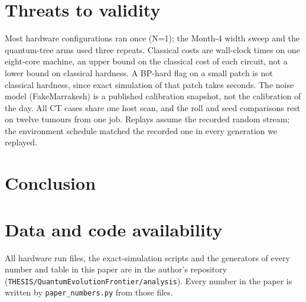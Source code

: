 \documentclass[conference]{IEEEtran}
\begin{document}
\section{Threats to validity}
Most hardware configurations ran once (N=1); the Month-4 width sweep and the quantum-tree arms used three
repeats. Classical costs are wall-clock times on one eight-core machine, an upper bound on the classical cost of
each circuit, not a lower bound on classical hardness. A BP-hard flag on a small patch is not classical hardness,
since exact simulation of that patch takes seconds. The noise model (FakeMarrakesh) is a published calibration
snapshot, not the calibration of the day. All CT cases share one host scan, and the roll and seed comparisons rest
on twelve tumours from one job. Replays assume the recorded random stream; the environment schedule matched the
recorded one in every generation we replayed.

\section{Conclusion}
\conclusionParagraph

\section*{Data and code availability}
All hardware run files, the exact-simulation scripts and the generators of every number and table in this paper
are in the author's repository (\texttt{THESIS/QuantumEvolutionFrontier/analysis}). Every number in the paper is
written by \texttt{paper\_numbers.py} from those files.



\end{document}
